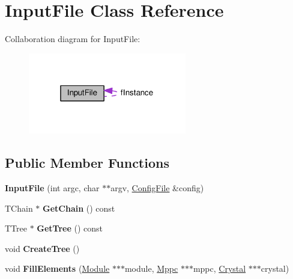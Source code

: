 \hypertarget{classInputFile}{\section{Input\+File Class Reference}
\label{classInputFile}
}


Collaboration diagram for Input\+File\+:\nopagebreak
\begin{figure}[H]
\begin{center}
\leavevmode
\includegraphics[width=196pt]{classInputFile__coll__graph}
\end{center}
\end{figure}
\subsection*{Public Member Functions}
\begin{DoxyCompactItemize}
\item 
\hypertarget{classInputFile_a1e310e7fc2da2ba81f2b959661625af6}{{\bfseries Input\+File} (int argc, char $\ast$$\ast$argv, \hyperlink{classConfigFile}{Config\+File} \&config)}\label{classInputFile_a1e310e7fc2da2ba81f2b959661625af6}

\item 
\hypertarget{classInputFile_a948e7cc1141e3f3b05fbbf836408a085}{T\+Chain $\ast$ {\bfseries Get\+Chain} () const }\label{classInputFile_a948e7cc1141e3f3b05fbbf836408a085}

\item 
\hypertarget{classInputFile_a2ab271cc4fac7e35b43d97b5901eeac8}{T\+Tree $\ast$ {\bfseries Get\+Tree} () const }\label{classInputFile_a2ab271cc4fac7e35b43d97b5901eeac8}

\item 
\hypertarget{classInputFile_a3dc20eebe07374d6abbc83c39744c464}{void {\bfseries Create\+Tree} ()}\label{classInputFile_a3dc20eebe07374d6abbc83c39744c464}

\item 
\hypertarget{classInputFile_ae4004a365b09e90a562732bc761e1cb5}{void {\bfseries Fill\+Elements} (\hyperlink{classModule}{Module} $\ast$$\ast$$\ast$module, \hyperlink{classMppc}{Mppc} $\ast$$\ast$$\ast$mppc, \hyperlink{classCrystal}{Crystal} $\ast$$\ast$$\ast$crystal)}\label{classInputFile_ae4004a365b09e90a562732bc761e1cb5}

\end{DoxyCompactItemize}
